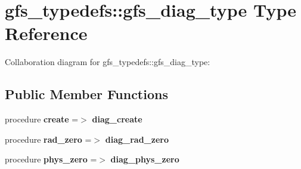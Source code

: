 \section{gfs\+\_\+typedefs\+:\+:gfs\+\_\+diag\+\_\+type Type Reference}
\label{structgfs__typedefs_1_1gfs__diag__type}


Collaboration diagram for gfs\+\_\+typedefs\+:\+:gfs\+\_\+diag\+\_\+type\+:
\subsection*{Public Member Functions}
\begin{DoxyCompactItemize}
\item 
procedure \textbf{ create} =$>$ \textbf{ diag\+\_\+create}
\item 
procedure \textbf{ rad\+\_\+zero} =$>$ \textbf{ diag\+\_\+rad\+\_\+zero}
\item 
procedure \textbf{ phys\+\_\+zero} =$>$ \textbf{ diag\+\_\+phys\+\_\+zero}
\end{DoxyCompactItemize}
